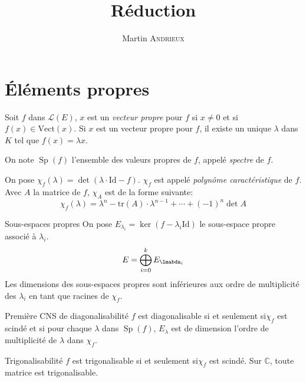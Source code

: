 \documentclass[french, a4paper, 11pt, twocolumn]{article}
\title{Réduction}
\author{Martin \textsc{Andrieux}}
\date{}
\newcommand{\ssi}{si et seulement si\xspace}		%
\DeclareMathOperator{\Sp}{Sp}
\newcommand{\C}{\mathbb{C}}   %
\newcommand{\po}{\left(}         %
\newcommand{\pf}{\right)}        %
\newcommand{\pof}[1]{\po #1 \pf} %
\begin{document}
\maketitle

\section{Éléments propres}
\begin{definition}
  Soit $f$ dans $\mathcal L(E)$, $x$ est un \emph{vecteur propre} pour $f$ si $x\neq 0$ et si $f(x)\in \mathrm{Vect}(x)$.
  Si $x$ est un vecteur propre pour $f$, il existe un unique $\lambda$ dans $K$ tel que $f(x) = \lambda x$.

  On note $\Sp(f)$ l'ensemble des valeurs propres de $f$, appelé \emph{spectre} de $f$.
\end{definition}

\begin{definition}
  On pose $\chi_{f}(\lambda) = \det\pof{\lambda\cdot\mathrm{Id} - f}$. $\chi_{f}$ est appelé \emph{polynôme caractéristique} de $f$. Avec $A$ la matrice de $f$, $\chi_{A}$ est de la forme suivante:
  \[\chi_{f}(\lambda) = \lambda^{n}-\mathrm{tr}(A)\cdot\lambda^{n-1}+\cdots+\pof{-1}^{n}\det A\]
\end{definition}

\begin{theoreme}{Sous-espaces propres}
  On pose $E_{\lambda_{i}} = \ker(f-\lambda_{i}\mathrm{Id})$ le sous-espace propre associé à $\lambda_{i}$.
  \[E = \bigoplus_{i=0}^{k}E_{\lmabda_{i}}\]
  Les dimensions des sous-espaces propres sont inférieures aux ordre de multiplicité des $\lambda_{i}$ en tant que racines de $\chi_{f}$.
\end{theoreme}

\begin{theoreme}{Première CNS de diagonalisabilité}
  $f$ est diagonalisable \ssi $\chi_{f}$ est scindé et si pour chaque $\lambda$ dans $\Sp(f)$, $E_{\lambda}$ est de dimension l'ordre de multiplicité de $\lambda$ dans $\chi_{f}$.
\end{theoreme}

\begin{theoreme}{Trigonalisabilité}
  $f$ est trigonalisable \ssi $\chi_{f}$ est scindé.
  \tcblower
  Sur $\C$, toute matrice est trigonalisable.
\end{theoreme}
\end{document}
